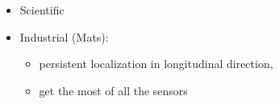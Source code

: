 \begin{itemize}
\item  Scientific \cite{DBLP:journals/corr/CadenaCCLSN0L16}
\item  Industrial (Mats):
  \begin{itemize}
  \item persistent localization in longitudinal direction,
  \item get the most of all the sensors
  \end{itemize}
\end{itemize}

